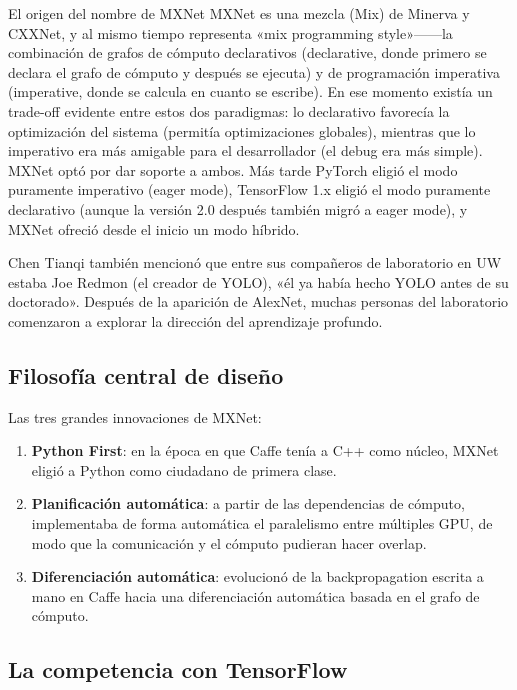 \begin{knowledgebox}{El origen del nombre de MXNet}
MXNet es una mezcla (Mix) de Minerva y CXXNet, y al mismo tiempo representa «mix programming style»------la combinación de grafos de cómputo declarativos (declarative, donde primero se declara el grafo de cómputo y después se ejecuta) y de programación imperativa (imperative, donde se calcula en cuanto se escribe). En ese momento existía un trade-off evidente entre estos dos paradigmas: lo declarativo favorecía la optimización del sistema (permitía optimizaciones globales), mientras que lo imperativo era más amigable para el desarrollador (el debug era más simple). MXNet optó por dar soporte a ambos. Más tarde PyTorch eligió el modo puramente imperativo (eager mode), TensorFlow 1.x eligió el modo puramente declarativo (aunque la versión 2.0 después también migró a eager mode), y MXNet ofreció desde el inicio un modo híbrido.
\end{knowledgebox}

Chen Tianqi también mencionó que entre sus compañeros de laboratorio en UW estaba Joe Redmon (el creador de YOLO), «él ya había hecho YOLO antes de su doctorado». Después de la aparición de AlexNet, muchas personas del laboratorio comenzaron a explorar la dirección del aprendizaje profundo.

\subsection{Filosofía central de diseño}

Las tres grandes innovaciones de MXNet:
\begin{enumerate}
    \item \textbf{Python First}: en la época en que Caffe tenía a C++ como núcleo, MXNet eligió a Python como ciudadano de primera clase.
    \item \textbf{Planificación automática}: a partir de las dependencias de cómputo, implementaba de forma automática el paralelismo entre múltiples GPU, de modo que la comunicación y el cómputo pudieran hacer overlap.
    \item \textbf{Diferenciación automática}: evolucionó de la backpropagation escrita a mano en Caffe hacia una diferenciación automática basada en el grafo de cómputo.
\end{enumerate}

\subsection{La competencia con TensorFlow}

